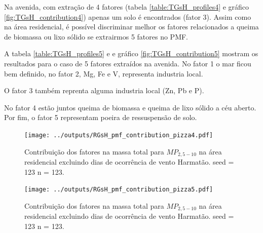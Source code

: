 Na avenida, com extração de 4 fatores (tabela \ref{table:TGsH_profiles4} 
e gráfico \ref{fig:TGsH_contribution4}) apenas um solo é encontrados
(fator 3). Assim como na área residencial, é possível discriminar melhor 
os fatores relacionados a queima de biomassa ou lixo sólido se extrairmos 5
fatores no PMF. 

A tabela \ref{table:TGsH_profiles5} e e gráfico \ref{fig:TGsH_contribution5} 
mostram os resultados para o caso de 5 fatores extraídos na avenida. 
No fator 1 o mar ficou
bem definido, no fator 2, Mg, Fe e V, representa industria local. 

O fator 3 também reprenta alguma industria local (Zn, Pb e P).

No fator 4 estão juntos queima de biomassa e queima de lixo sólido a céu aberto. 
Por fim, o fator 5 representam poeira de ressuspensão de solo.  

\begin{landscape}
  \begin{figure}
    \centering
    \begin{minipage}[b]{0.45\linewidth}
      \texttt{[image: ../outputs/RGsH\_pmf\_contribution\_pizza4.pdf]}
      \caption{Contribuição dos fatores na massa total para $MP_{2,5-10}$ na área
               residencial excluindo dias de ocorrência de vento Harmatão. seed = 123 n = 123.
               \label{fig:RGsH_contribution4}}
    \end{minipage}%
    \hspace{0.5cm}
    \begin{minipage}[b]{0.45\linewidth}
      
    \end{minipage}
  \end{figure}
\end{landscape}

\begin{landscape}
  \begin{figure}
    \centering
    \begin{minipage}[b]{0.45\linewidth}
      \texttt{[image: ../outputs/RGsH\_pmf\_contribution\_pizza5.pdf]}
      \caption{Contribuição dos fatores na massa total para $MP_{2,5-10}$ na área
               residencial excluindo dias de ocorrência de vento Harmatão. seed = 123 n = 123.
               \label{fig:RGsH_contribution5}}
    \end{minipage}%
    \hspace{0.5cm}
    \begin{minipage}[b]{0.45\linewidth}
      
    \end{minipage}
  \end{figure}
\end{landscape}

